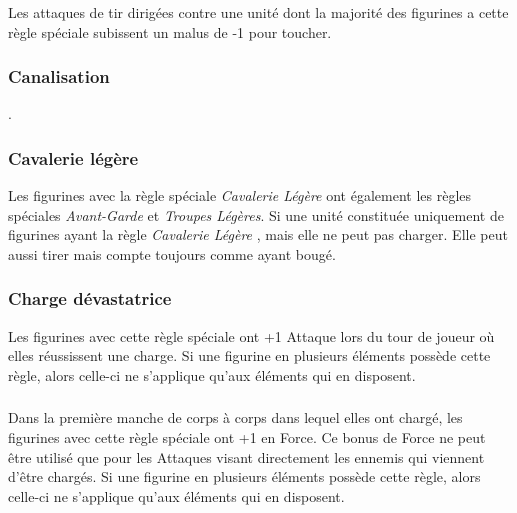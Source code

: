 \subsubsection*{}

Les attaques de tir dirigées contre une unité dont la majorité des figurines a cette règle spéciale subissent un malus de -1 pour toucher.

\subsubsection*{Canalisation}

.

\subsubsection*{Cavalerie légère}

Les figurines avec la règle spéciale \emph{Cavalerie Légère} ont également les règles spéciales \emph{Avant-Garde} et \emph{Troupes Légères}. Si une unité constituée uniquement de figurines ayant la règle \emph{Cavalerie Légère} , mais elle ne peut pas charger. Elle peut aussi tirer mais compte toujours comme ayant bougé.

\subsubsection*{Charge dévastatrice}

Les figurines avec cette règle spéciale ont +1 Attaque lors du tour de joueur où elles réussissent une charge. Si une figurine en plusieurs éléments possède cette règle, alors celle-ci ne s'applique qu'aux éléments qui en disposent.

\subsubsection*{}

Dans la première manche de corps à corps dans lequel elles ont chargé, les figurines avec cette règle spéciale ont +1 en Force. Ce bonus de Force ne peut être utilisé que pour les Attaques visant directement les ennemis qui viennent d'être chargés. Si une figurine en plusieurs éléments possède cette règle, alors celle-ci ne s'applique qu'aux éléments qui en disposent.

